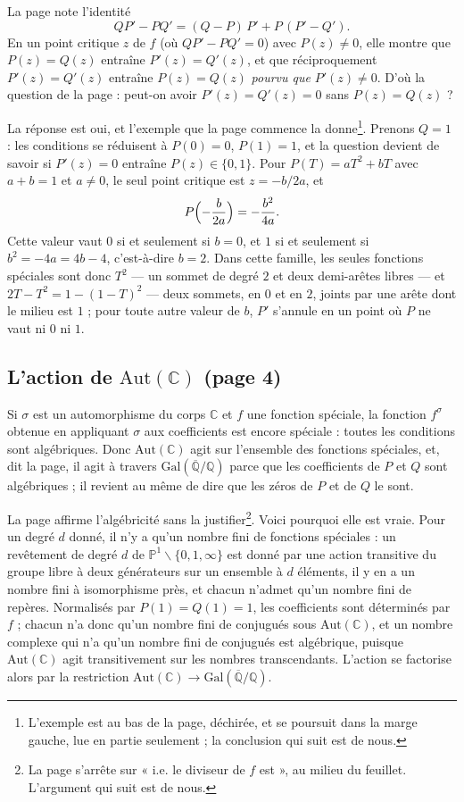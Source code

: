 \documentclass[11pt,a4paper]{article}
\begin{document}
La page note l'identité
\[
Q P' - P Q' = (Q - P)\,P' + P\,(P' - Q').
\]
En un point critique $z$ de $f$ (où $QP' - PQ' = 0$) avec $P(z) \neq 0$, elle
montre que $P(z) = Q(z)$ entraîne $P'(z) = Q'(z)$, et que réciproquement
$P'(z) = Q'(z)$ entraîne $P(z) = Q(z)$ \emph{pourvu que} $P'(z) \neq 0$. D'où
la question de la page : peut-on avoir $P'(z) = Q'(z) = 0$ sans $P(z) =
Q(z)$ ?

La réponse est oui, et l'exemple que la page commence la
donne\footnote{L'exemple est au bas de la page, déchirée, et se poursuit dans
la marge gauche, lue en partie seulement ; la conclusion qui suit est de
nous.}. Prenons $Q = 1$ : les conditions se réduisent à $P(0) = 0$, $P(1) =
1$, et la question devient de savoir si $P'(z) = 0$ entraîne $P(z) \in \{0,
1\}$. Pour $P(T) = aT^2 + bT$ avec $a + b = 1$ et $a \neq 0$, le seul point
critique est $z = -b/2a$, et
\[
P\Bigl(-\frac{b}{2a}\Bigr) = -\frac{b^2}{4a}.
\]
Cette valeur vaut $0$ si et seulement si $b = 0$, et $1$ si et seulement si
$b^2 = -4a = 4b - 4$, c'est-à-dire $b = 2$. Dans cette famille, les seules
fonctions spéciales sont donc $T^2$ --- un sommet de degré $2$ et deux
demi-arêtes libres --- et $2T - T^2 = 1 - (1-T)^2$ --- deux sommets, en $0$ et
en $2$, joints par une arête dont le milieu est $1$ ; pour toute autre valeur
de $b$, $P'$ s'annule en un point où $P$ ne vaut ni $0$ ni $1$.

\subsection*{L'action de $\mathrm{Aut}(\mathbb{C})$ (page 4)}

Si $\sigma$ est un automorphisme du corps $\mathbb{C}$ et $f$ une fonction
spéciale, la fonction $f^{\sigma}$ obtenue en appliquant $\sigma$ aux
coefficients est encore spéciale : toutes les conditions sont algébriques.
Donc $\mathrm{Aut}(\mathbb{C})$ agit sur l'ensemble des fonctions spéciales,
et, dit la page, il agit à travers
$\mathrm{Gal}(\overline{\mathbb{Q}}/\mathbb{Q})$ parce que les coefficients
de $P$ et $Q$ sont algébriques ; il revient au même de dire que les zéros de
$P$ et de $Q$ le sont.

La page affirme l'algébricité sans la justifier\footnote{La page s'arrête sur
« i.e. le diviseur de $f$ est », au milieu du feuillet. L'argument qui suit
est de nous.}. Voici pourquoi elle est vraie. Pour un degré $d$ donné, il n'y
a qu'un nombre fini de fonctions spéciales : un revêtement de degré $d$ de
$\mathbb{P}^1 \smallsetminus \{0,1,\infty\}$ est donné par une action
transitive du groupe libre à deux générateurs sur un ensemble à $d$
éléments, il y en a un nombre fini à isomorphisme près, et chacun n'admet
qu'un nombre fini de repères. Normalisés par $P(1) = Q(1) = 1$, les
coefficients sont déterminés par $f$ ; chacun n'a donc qu'un nombre fini de
conjugués sous $\mathrm{Aut}(\mathbb{C})$, et un nombre complexe qui n'a
qu'un nombre fini de conjugués est algébrique, puisque $\mathrm{Aut}(\mathbb{C})$
agit transitivement sur les nombres transcendants. L'action se factorise
alors par la restriction $\mathrm{Aut}(\mathbb{C}) \to
\mathrm{Gal}(\overline{\mathbb{Q}}/\mathbb{Q})$.
\end{document}
